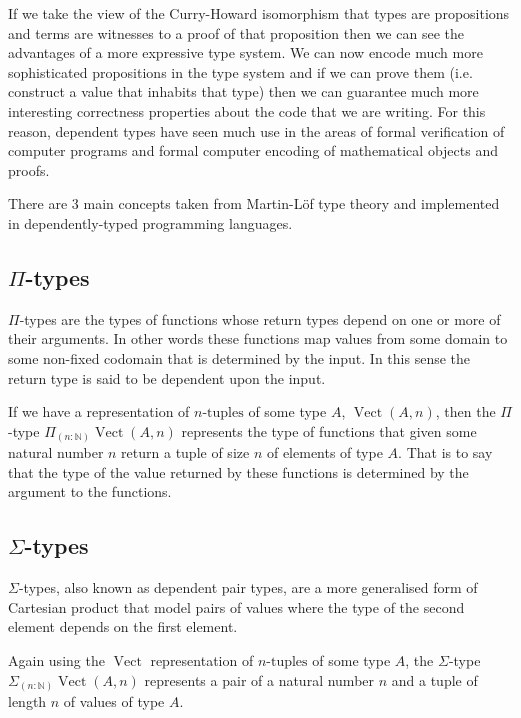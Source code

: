 \documentclass[a4paper, notitlepage]{report}
\begin{document}
If we take the view of the Curry-Howard isomorphism that types are propositions
and terms are witnesses to a proof of that proposition then we can see the
advantages of a more expressive type system. We can now encode much more
sophisticated propositions in the type system and if we can prove them (i.e.
construct a value that inhabits that type) then we can guarantee much more
interesting correctness properties about the code that we are writing. For this
reason, dependent types have seen much use in the areas of formal verification
of computer programs and formal computer encoding of mathematical objects and
proofs.

There are 3 main concepts taken from Martin-Löf type theory and implemented in
dependently-typed programming languages.

\subsection{\texorpdfstring{$\Pi$}{Pi}-types}
\label{sec:orgc31e931}
\(\Pi\)-types are the types of functions whose return types depend on one or more of
their arguments. In other words these functions map values from some domain to
some non-fixed codomain that is determined by the input. In this sense the
return type is said to be dependent upon the input.

If we have a representation of \(n\textrm{-tuples}\) of some type \(A\),
\(\operatorname{Vect}(A,n)\), then the \(\Pi\)-type \(\Pi_{(n \mathbin{:} {\mathbb N})}
\operatorname{Vect}(A,n)\) represents the type of functions that given some
natural number \(n\) return a tuple of size \(n\) of elements of type \(A\). That is
to say that the type of the value returned by these functions is determined by
the argument to the functions.

\subsection{\texorpdfstring{$\Sigma$}{Sigma}-types}
\label{sec:org1ca7eba}
\(\Sigma\)-types, also known as dependent pair types, are a more generalised form of
Cartesian product that model pairs of values where the type of the second
element depends on the first element.

Again using the \(\operatorname{Vect}\) representation of \(n\textrm{-tuples}\) of
some type \(A\), the \(\Sigma\)-type \(\Sigma_{(n \mathbin{:} {\mathbb N})}
\operatorname{Vect}(A,n)\) represents a pair of a natural number \(n\) and a tuple
of length \(n\) of values of type \(A\).
\end{document}
